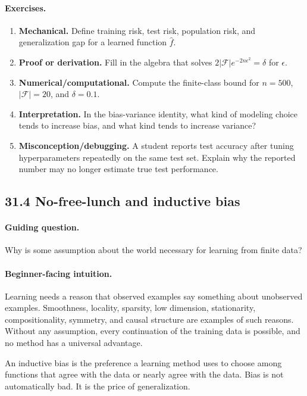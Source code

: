 \paragraph{Exercises.}
\begin{enumerate}[label=\textbf{31.3.\arabic*.}, leftmargin=*]
\item \textbf{Mechanical.} Define training risk, test risk, population risk, and generalization gap for a learned function \(\widehat f\).
\item \textbf{Proof or derivation.} Fill in the algebra that solves \(2|\mathcal F|e^{-2n\epsilon^2}=\delta\) for \(\epsilon\).
\item \textbf{Numerical/computational.} Compute the finite-class bound for \(n=500\), \(|\mathcal F|=20\), and \(\delta=0.1\).
\item \textbf{Interpretation.} In the bias-variance identity, what kind of modeling choice tends to increase bias, and what kind tends to increase variance?
\item \textbf{Misconception/debugging.} A student reports test accuracy after tuning hyperparameters repeatedly on the same test set. Explain why the reported number may no longer estimate true test performance.
\end{enumerate}

\subsection{31.4 No-free-lunch and inductive bias}

\paragraph{Guiding question.}
Why is some assumption about the world necessary for learning from finite data?

\paragraph{Beginner-facing intuition.}
Learning needs a reason that observed examples say something about unobserved examples. Smoothness, locality, sparsity, low dimension, stationarity, compositionality, symmetry, and causal structure are examples of such reasons. Without any assumption, every continuation of the training data is possible, and no method has a universal advantage.

An inductive bias is the preference a learning method uses to choose among functions that agree with the data or nearly agree with the data. Bias is not automatically bad. It is the price of generalization.

